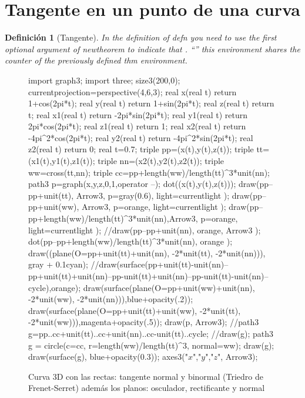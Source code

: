 \documentclass[a4paper]{book}
\newtheorem{defn}[thm]{Definición}
\begin{document}
\section{Tangente en un punto de una curva}
\begin{defn}[Tangente] In the definition of defn you need to use the first optional argument of  newtheorem to indicate that \cite{hilbert2020geometry}. ``''  this environment shares the counter of the previously defined thm environment.\end{defn}
\cite{reyes} \cite{www}

\begin{figure}[!ht]
	\centering
	\begin{asy}
	import graph3;
	import three;
	size3(200,0);
	currentprojection=perspective(4,6,3);
	real x(real t) {return 1+cos(2pi*t);}
	real y(real t) {return 1+sin(2pi*t);}
	real z(real t) {return t;}
	real x1(real t) {return -2pi*sin(2pi*t);}
	real y1(real t) {return 2pi*cos(2pi*t);}
	real z1(real t) {return 1;}
	real x2(real t) {return -4pi^2*cos(2pi*t);}
	real y2(real t) {return -4pi^2*sin(2pi*t);}
	real z2(real t) {return 0;}
	real t=0.7;
	triple pp=(x(t),y(t),z(t));
	triple tt=(x1(t),y1(t),z1(t));
	triple nn=(x2(t),y2(t),z2(t));
	triple ww=cross(tt,nn);
	triple cc=pp+length(ww)/length(tt)^3*unit(nn);
	path3 p=graph(x,y,z,0,1,operator --);
	dot((x(t),y(t),z(t)));
	draw(pp--pp+unit(tt), Arrow3, p=gray(0.6), light=currentlight );
	draw(pp--pp+unit(ww), Arrow3, p=orange, light=currentlight );
	draw(pp--pp+length(ww)/length(tt)^3*unit(nn),Arrow3, p=orange, light=currentlight );
	//draw(pp--pp+unit(nn), orange, Arrow3 );
	dot(pp--pp+length(ww)/length(tt)^3*unit(nn), orange );
	draw((plane(O=pp+unit(tt)+unit(nn), -2*unit(tt), -2*unit(nn))), gray + 0.1cyan);
	//draw(surface(pp+unit(tt)-unit(nn)--pp+unit(tt)+unit(nn)--pp-unit(tt)+unit(nn)--pp-unit(tt)-unit(nn)--cycle),orange);
	draw(surface(plane(O=pp+unit(ww)+unit(nn), -2*unit(ww), -2*unit(nn))),blue+opacity(.2));
	draw(surface(plane(O=pp+unit(tt)+unit(ww), -2*unit(tt), -2*unit(ww))),magenta+opacity(.5));
	draw(p, Arrow3);
	//path3 g=pp..cc+unit(tt)..cc+unit(nn)..cc-unit(tt)..cycle;
	//draw(g);
	path3 g = circle(c=cc, r=length(ww)/length(tt)^3, normal=ww);
	draw(g);
	draw(surface(g), blue+opacity(0.3));
	axes3("$x$","$y$","$z$", Arrow3);
	\end{asy}
	\caption{Curva 3D con las rectas: tangente normal y binormal (Triedro de Frenet-Serret) además los planos: osculador, rectificante y normal}
\end{figure}
\end{document}
